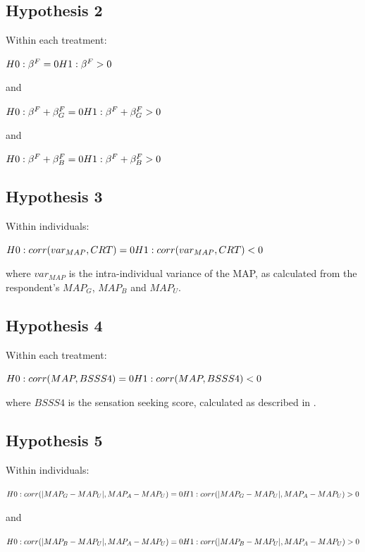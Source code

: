 \subsection{Hypothesis 2}
Within each treatment:

\noindent $H0: \beta^F = 0 \\
H1: \beta^F > 0$

\noindent and

\noindent $H0: \beta^F + \beta_G^F = 0 \\
H1: \beta^F + \beta_G^F > 0$

\noindent and

\noindent $H0: \beta^F + \beta_B^F = 0 \\
H1: \beta^F + \beta_B^F > 0$

\subsection{Hypothesis 3}
Within individuals:

\noindent $H0: corr(var_{MAP},CRT) = 0 \\
H1: corr(var_{MAP},CRT) < 0$

\noindent where $var_{MAP}$ is the intra-individual variance of the MAP, as calculated from the respondent's $MAP_G$, $MAP_B$ and $MAP_U$.

\subsection{Hypothesis 4}
Within each treatment:

\noindent $H0: corr(MAP,BSSS4) = 0 \\
H1: corr(MAP,BSSS4) < 0$

\noindent where $BSSS4$ is the sensation seeking score, calculated as described in \cite{Cheek2017}.

\subsection{Hypothesis 5}
Within individuals:

\noindent $H0: corr(|MAP_G - MAP_U|,MAP_A - MAP_U) = 0 \\
H1: corr(|MAP_G - MAP_U|,MAP_A - MAP_U) > 0$

\noindent and

\noindent $H0: corr(|MAP_B - MAP_U|,MAP_A - MAP_U) = 0 \\
H1: corr(|MAP_B - MAP_U|,MAP_A - MAP_U) > 0$



